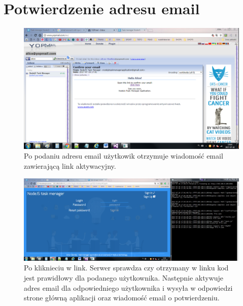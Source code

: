 \documentclass[12pt]{report}
\begin{document}
\section{Potwierdzenie adresu email}
\begin{figure}[!hb]
\centering
\includegraphics[width=\textwidth,height=\textheight,keepaspectratio]{31.png}
\captionsetup{labelformat=empty}
\caption[]{Po podaniu adresu email użytkowik otrzymuje wiadomość email zawierającą link aktywacyjny.}
\end{figure}
\begin{figure}[!hb]
\centering
\includegraphics[width=\textwidth,height=\textheight,keepaspectratio]{32.png}
\captionsetup{labelformat=empty}
\caption[]{Po kliknieciu w link. Serwer sprawdza czy otrzymany w linku kod jest prawidłowy dla podanego użytkownika. 
Następnie aktywuje adres email dla odpowiedniego użytkownika i wysyła w odpowiedzi strone główną aplikacji oraz wiadomość email o potwierdzeniu.}
\end{figure}
\end{document}
